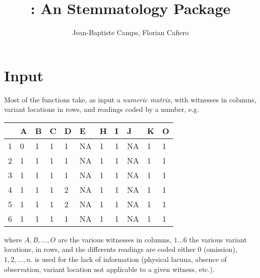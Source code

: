 \documentclass[article,nojss]{jss}
\author{Jean-Baptiste Camps, Florian Cafiero}
\title{\pkg{stemmatology}: An \proglang{R} Stemmatology Package}
\begin{document}
\renewenvironment{Schunk}{}{}




\maketitle


\section{Input}

Most of the functions take, as input a \emph{numeric matrix}, with witnesses in columns, variant locations in rows, and readings coded by a number, e.g.

\begin{table}[!h]
\begin{tabular}{lllllllllll}
  & A & B & C & D & E & H & I & J & K & O\\ \hline \hline 
1 & 0 & 1 & 1 & 1 & NA & 1 & 1 & NA & 1 & 1\\
2 & 1 & 1 & 1 & 1 & NA & 1 & 1 & NA & 1 & 1\\
3 & 1 & 1 & 1 & 1 & NA & 1 & 1 & NA & 1 & 1\\
4 & 1 & 1 & 1 & 2 & NA & 1 & 1 & NA & 1 & 1\\
5 & 1 & 1 & 1 & 2 & NA & 1 & 1 & NA & 1 & 1\\
6 & 1 & 1 & 1 & 1 & NA & 1 & 1 & NA & 1 & 1
\end{tabular}
\end{table}
where $A, B, …, O$ are the various witnesses in columns, $1 … 6$ the various variant locations, in rows, and the differents readings are coded either $0$ (omission), $1, 2, …, n$.  is used for the lack of information (physical lacuna, absence of observation, variant location not applicable to a given witness, etc.).
\end{document}
